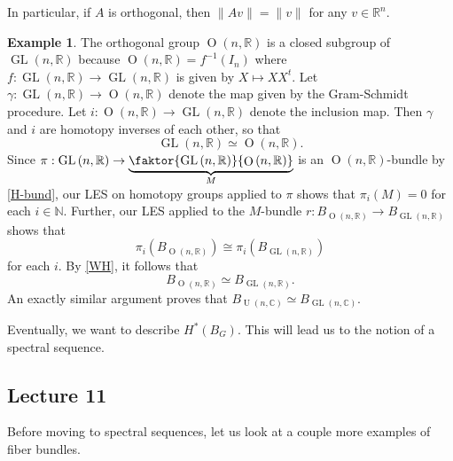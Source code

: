 \documentclass[10pt,letterpaper,cm]{nupset}
\theoremstyle{definition}
\newtheorem{exmp}[defn]{Example}
\theoremstyle{theorem}
\theoremstyle{remark}
\newcommand{\C}{\mathbb C}
\newcommand{\N}{\mathbb N}
\newcommand{\R}{\mathbb{R}}
\newcommand{\1}{\mathbb{1}}
\newcommand{\0}{\vec 0}
\DeclareMathOperator{\GL}{GL}
\DeclareMathOperator{\Or}{O}
\DeclareMathOperator{\Un}{U}
\begin{document}
In particular, if $A$ is orthogonal, then $\|Av\| = \|v\|$ for any $v\in \R^n$.

\begin{exmp}
The orthogonal group $\Or\left(n, \R\right)$ is a closed subgroup of $\GL\left(n, \R\right)$ because  $\Or\left(n, \R\right)= f^{-1}\left(I_n\right)$ where $f: \GL\left(n, \R\right) \to \GL\left(n, \R\right)$ is given by $X \mapsto XX^t$. Let $\gamma : \GL\left(n, \R\right) \to \Or\left(n, \R\right)$ denote the map given by the Gram-Schmidt procedure. Let $i : \Or\left(n, \R\right) \to \GL\left(n, \R\right)$ denote the inclusion map. Then $\gamma$ and $i$ are homotopy inverses of each other, so that 
\[
\GL\left(n, \R\right) \simeq \Or\left(n, \R\right).
\]  Since $\pi : \GL\left(n, \R\right) \to \underbrace{\faktor{\GL\left(n, \R\right) }{\Or\left(n, \R\right)}}_{M}$ is an $\Or\left(n, \R\right)$-bundle by \cref{H-bund}, our LES on homotopy groups applied to $\pi$ shows that $\pi_i\left(M\right) =0$ for each $i\in \N$. Further, our LES  applied to the $M$-bundle $r: B_{\Or\left(n, \R\right)} \to B_{\GL\left(n, \R\right)}$ shows that $$\pi_i\left(B_{\Or\left(n, \R\right)}\right) \cong \pi_i\left(B_{\GL\left(n, \R\right)}\right)$$ for each $i$. By \cref{WH}, it follows that 
\[
B_{\Or\left(n, \R\right)} \simeq B_{\GL\left(n, \R\right)}
.\] An exactly similar argument proves that $B_{\Un\left(n, \C\right)} \simeq B_{\GL\left(n, \C\right)}$.
\end{exmp}

Eventually, we want to describe $H^{\ast}\left(B_G\right)$. This will lead us to the notion of a spectral sequence. 

\subsection{Lecture 11}

Before moving to spectral sequences, let us look at a couple more examples of fiber bundles.
\end{document}

